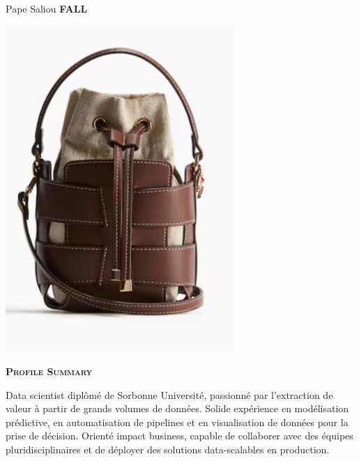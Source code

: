 \documentclass[11pt,a4paper]{article}
\newcommand{\headleft}[1]{\vspace*{3ex}\textsc{\textbf{#1}}\par%
    \vspace*{-1.5ex}\hrulefill\par\vspace*{0.7ex}}
\begin{document}
\setlength{\topskip}{0pt}\setlength{\parindent}{0pt}\setlength{\parskip}{0pt}
\setlength{\fboxsep}{0pt}\pagestyle{empty}\raggedbottom

\begin{minipage}[t]{0.33\textwidth}
\colorbox{cvblue}{\begin{minipage}[t][5mm][t]{\textwidth}\null\hfill\null\end{minipage}}
\vspace{-.2ex}
\colorbox{cvblue!90}{\color{white}
\textwidth
\begin{minipage}[t][293mm][t]{0.82\textwidth}\raggedright
\vspace*{2.5ex}

\Large Pape Saliou \textbf{\textsc{FALL}} \normalsize

\null\hfill\includegraphics[width=0.65\textwidth]{ 77bf068f9d5a4e33b383d87c34217238.png }\hfill\null

\vspace*{0.5ex}

\headleft{Profile Summary}
Data scientist diplômé de Sorbonne Université, passionné par l’extraction de valeur à partir de grands volumes de données. Solide expérience en modélisation prédictive, en automatisation de pipelines et en visualisation de données pour la prise de décision. Orienté impact business, capable de collaborer avec des équipes pluridisciplinaires et de déployer des solutions data-scalables en production.


\end{minipage}}
\end{minipage}
\end{document}
